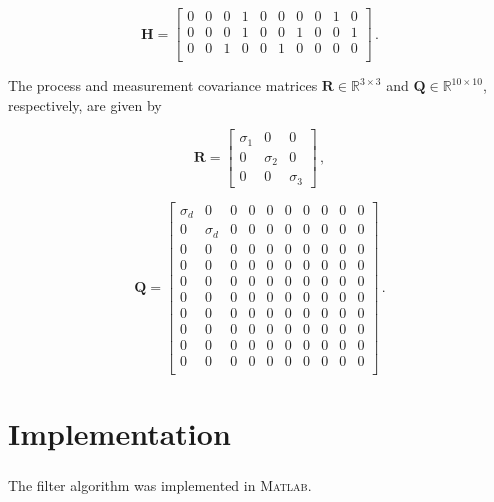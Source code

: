 \begin{equation}
\mathbf{H} = \begin{bmatrix}
  0 & 0 & 0 & 1 & 0 & 0 & 0 & 0 & 1 & 0\\
  0 & 0 & 0 & 1 & 0 & 0 & 1 & 0 & 0 & 1\\
  0 & 0 & 1 & 0 & 0 & 1 & 0 & 0 & 0 & 0\\
\end{bmatrix}\,.
\end{equation}

The process and measurement covariance matrices $\mathbf{R} \in \mathbb{R}^{3 \times 3}$ and $\mathbf{Q} \in \mathbb{R}^{10 \times 10}$, respectively, are given by

\begin{equation}
\mathbf{R} = \begin{bmatrix}
  \sigma_1 & 0 & 0\\
  0 & \sigma_2 & 0\\
  0 & 0 & \sigma_3
\end{bmatrix}\,,
\end{equation}

\begin{equation}
\mathbf{Q} = \begin{bmatrix}
  \sigma_d & 0 & 0 & 0 & 0 & 0 & 0 & 0 & 0 & 0\\
  0 & \sigma_d & 0 & 0 & 0 & 0 & 0 & 0 & 0 & 0\\
  0 & 0 & 0 & 0 & 0 & 0 & 0 & 0 & 0 & 0\\
  0 & 0 & 0 & 0 & 0 & 0 & 0 & 0 & 0 & 0\\
  0 & 0 & 0 & 0 & 0 & 0 & 0 & 0 & 0 & 0\\
  0 & 0 & 0 & 0 & 0 & 0 & 0 & 0 & 0 & 0\\
  0 & 0 & 0 & 0 & 0 & 0 & 0 & 0 & 0 & 0\\
  0 & 0 & 0 & 0 & 0 & 0 & 0 & 0 & 0 & 0\\
  0 & 0 & 0 & 0 & 0 & 0 & 0 & 0 & 0 & 0\\
  0 & 0 & 0 & 0 & 0 & 0 & 0 & 0 & 0 & 0\\
\end{bmatrix}\,.
\end{equation}

\section{Implementation}

The filter algorithm was implemented in \textsc{Matlab}\textsuperscript{\textregistered}.


